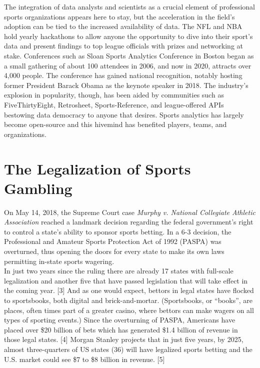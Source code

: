 \documentclass [MS] {uclathes}
\begin{document}
\noindent The integration of data analysts and scientists as a crucial element of professional sports organizations appears here to stay, but the acceleration in the field's adoption can be tied to the increased availability of data. The NFL and NBA hold yearly hackathons to allow anyone the opportunity to dive into their sport's data and present findings to top league officials with prizes and networking at stake. Conferences such as Sloan Sports Analytics Conference in Boston began as a small gathering of about 100 attendees in 2006, and now in 2020, attracts over 4,000 people. The conference has gained national recognition, notably hosting former President Barack Obama as the keynote speaker in 2018. The industry's explosion in popularity, though, has been aided by communities such as FiveThirtyEight, Retrosheet, Sports-Reference, and league-offered APIs bestowing data democracy to anyone that desires. Sports analytics has largely become open-source and this hivemind has benefited players, teams, and organizations. \\

 \section{The Legalization of Sports Gambling}
\noindent On May 14, 2018, the Supreme Court case \emph{Murphy v. National Collegiate Athletic Association} reached a landmark decision regarding the federal government's right to control a state's ability to sponsor sports betting. In a 6-3 decision, the Professional and Amateur Sports Protection Act of 1992 (PASPA) was overturned, thus opening the doors for every state to make its own laws permitting in-state sports wagering. \\

\noindent In just two years since the ruling there are already 17 states with full-scale legalization and another five that have passed legislation that will take effect in the coming year. [3] And as one would expect, bettors in legal states have flocked to sportsbooks, both digital and brick-and-mortar. (Sportsbooks, or ``books'', are places, often times part of a greater casino, where bettors can make wagers on all types of sporting events.) Since the overturning of PASPA, Americans have placed over \$20 billion of bets which has generated \$1.4 billion of revenue in those legal states. [4] Morgan Stanley projects that in just five years, by 2025, almost three-quarters of US states (36) will have legalized sports betting and the U.S. market could see \$7 to \$8 billion in revenue. [5] \\
\end{document}
